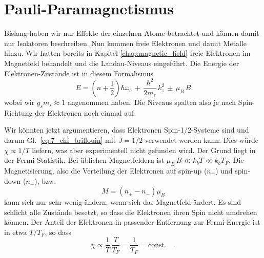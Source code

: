     



\section{Pauli-Paramagnetismus}

Bislang haben wir nur Effekte der einzelnen Atome betrachtet und können damit nur Isolatoren beschreiben. Nun kommen freie Elektronen und damit Metalle hinzu. Wir hatten bereits in Kapitel \ref{chap:magnetic_field}  freie Elektronen im Magnetfeld behandelt und die Landau-Niveaus eingeführt. Die Energie der Elektronen-Zustände ist in diesem Formalismus
\begin{equation}
    E = \left( n + \frac{1}{2} \right) \hbar \omega_c \, + \,
        \frac{\hbar^2}{2 m_e} \, k_z^2 \, \pm \, \mu_B \, B
\end{equation}
wobei wir $g_s m_s \approx 1$ angenommen haben. Die Niveaus spalten also je nach Spin-Richtung der Elektronen noch einmal auf. 

Wir könnten jetzt argumentieren, dass Elektronen Spin-1/2-Systeme sind und darum
Gl.~\ref{eq:7_chi_brillouin} mit $J = 1/2$ verwendet werden kann. Dies würde $\chi \propto 1/T$ liefern, was aber experimentell nicht gefunden wird. Der Grund liegt in der Fermi-Statistik. Bei üblichen Magnetfeldern ist
$\mu_B \, B \ll k_b T \ll k_b T_F$. Die Magnetisierung, also die Verteilung der Elektronen auf spin-up ($n_+$) und spin-down ($n_-$), bzw.
\begin{equation}
    M = (n_+ - n_-) \mu_B
\end{equation}
kann sich nur sehr wenig ändern, wenn sich das Magnetfeld ändert. Es sind schlicht alle Zustände besetzt, so dass die Elektronen ihren Spin nicht umdrehen können. Der Anteil der Elektronen in passender Entfernung zur Fermi-Energie ist in etwa $T/T_F$, so dass
\begin{equation}
    \chi \propto \frac{1}{T} \, \frac{T}{T_F} = \frac{1}{T_F} = \text{const.}  \quad .
\end{equation}

